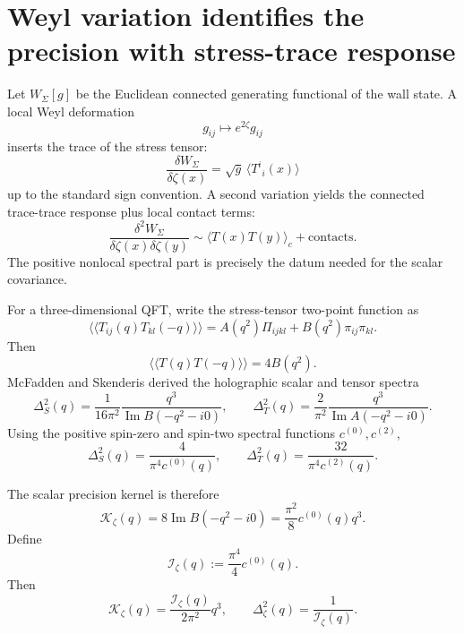 \documentclass[11pt]{article}
\numberwithin{equation}{section}
\newcommand{\Iz}{\mathcal I_\zeta}
\newcommand{\Kz}{\mathcal K_\zeta}
\newcommand{\cz}{c^{(0)}}
\newcommand{\ct}{c^{(2)}}
\begin{document}
\section{Weyl variation identifies the precision with stress-trace response}

Let $W_\Sigma[g]$ be the Euclidean connected generating functional of the wall state. A local Weyl deformation
\begin{equation}
g_{ij}\mapsto e^{2\zeta}g_{ij}
\end{equation}
inserts the trace of the stress tensor:
\begin{equation}
\frac{\delta W_\Sigma}{\delta\zeta(x)}=\sqrt g\,\langle T^i{}_i(x)\rangle
\end{equation}
up to the standard sign convention. A second variation yields the connected trace-trace response plus local contact terms:
\begin{equation}
\frac{\delta^2W_\Sigma}{\delta\zeta(x)\delta\zeta(y)}\sim\langle T(x)T(y)\rangle_c+\text{contacts}.
\end{equation}
The positive nonlocal spectral part is precisely the datum needed for the scalar covariance.

For a three-dimensional QFT, write the stress-tensor two-point function as
\begin{equation}
\langle\!\langle T_{ij}(q)T_{kl}(-q)\rangle\!\rangle=A(q^2)\Pi_{ijkl}+B(q^2)\pi_{ij}\pi_{kl}.
\end{equation}
Then
\begin{equation}
\langle\!\langle T(q)T(-q)\rangle\!\rangle=4B(q^2).
\end{equation}
McFadden and Skenderis derived the holographic scalar and tensor spectra
\begin{equation}
\Delta_S^2(q)=\frac{1}{16\pi^2}\frac{q^3}{\operatorname{Im}B(-q^2-i0)},
\qquad
\Delta_T^2(q)=\frac{2}{\pi^2}\frac{q^3}{\operatorname{Im}A(-q^2-i0)}.
\end{equation}
Using the positive spin-zero and spin-two spectral functions $\cz,\ct$,
\begin{equation}
\boxed{
\Delta_S^2(q)=\frac{4}{\pi^4\cz(q)},
\qquad
\Delta_T^2(q)=\frac{32}{\pi^4\ct(q)}.}
\label{eq:holo-powers}
\end{equation}

The scalar precision kernel is therefore
\begin{equation}
\boxed{
\Kz(q)=8\operatorname{Im}B(-q^2-i0)=\frac{\pi^2}{8}\cz(q)q^3.}
\label{eq:K-B}
\end{equation}
Define
\begin{equation}
\boxed{\Iz(q):=\frac{\pi^4}{4}\cz(q).}
\end{equation}
Then
\begin{equation}
\boxed{
\Kz(q)=\frac{\Iz(q)}{2\pi^2}q^3,
\qquad
\Delta_\zeta^2(q)=\frac1{\Iz(q)}.}
\label{eq:main-dictionary}
\end{equation}
\end{document}
